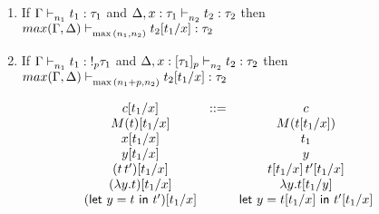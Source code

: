 \documentclass{article}
\begin{document}
\newpage
\begin{theorem} [Substitution] $ $
\label{thm:sub}
\begin{enumerate}
    \item If $\Gamma \mathrel{\vdash_{n_1}^{} {t_1} : {\tau_1}}$  and   $\Delta, x: \tau_1 \mathrel{\vdash_{n_2}^{} {t_2} : {\tau_2}}$ then $max(\Gamma, \Delta) \mathrel{\vdash_{\max{(n_1, n_2)}}^{} {t_2[t_1/x]} : {\tau_2}} $
    \item If $\Gamma \mathrel{\vdash_{n_1}^{} { t_1} : {!_p \tau_1}}$  and   $\Delta, x: [\tau_1]_p \mathrel{\vdash_{n_2}^{} {t_2} : {\tau_2}}$ then $max(\Gamma, \Delta) \mathrel{\vdash_{\max{(n_1 + p, n_2)}}^{} {t_2[t_1/x]} : {\tau_2}} $
\end{enumerate}
\end{theorem}
   \[
   \begin{array}{ccc}
     c [t_1/x]    & ::=& c  \\
     M(t) [t_1/x] &   & M(t[t_1/x]) \\
     x [t_1/x] && t_1 \\
     y [t_1/x] && y \\
     (\mathrel{ {t} \, {t'} }) [t_1/x] && \mathrel{ {t[t_1/x]} \, {t'[t_1/x]} }\\
     (\mathrel { \lambda {y} . {t} }) [t_1/x] && \mathrel { \lambda {y} . {t[t_1/y]} } \\
     (\mathrel{ \mathsf{let}\ {y} = {t} \ \mathsf{in} \ {t'} })[t_1/x] && \mathrel{ \mathsf{let}\ {y} = {t[t_1/x]} \ \mathsf{in} \ {t'[t_1/x]} }\\
   \end{array}
\]
\end{document}
